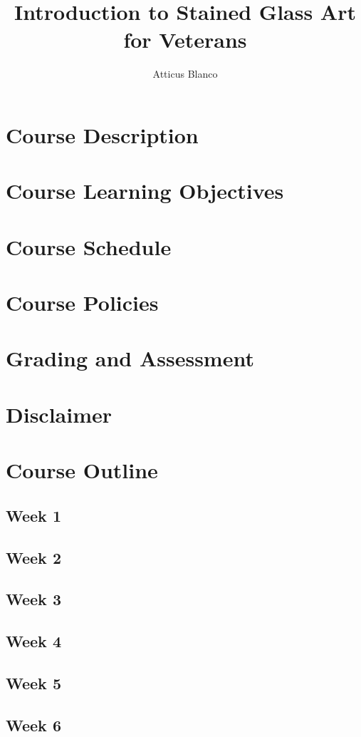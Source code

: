 \documentclass[11pt]{article}
\title{Introduction to Stained Glass Art for Veterans}
\author{Atticus Blanco}
\date{}
\begin{document}
    \section*{Course Description}

    \section*{Course Learning Objectives}

    \section*{Course Schedule}

    \section*{Course Policies}

    \section*{Grading and Assessment}

    \section*{Disclaimer}

    \section*{Course Outline}
        \subsection*{Week 1}
        \subsection*{Week 2}
        \subsection*{Week 3}
        \subsection*{Week 4}
        \subsection*{Week 5}
        \subsection*{Week 6}
\end{document}
